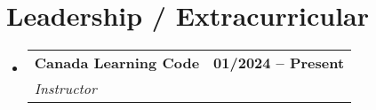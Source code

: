 \documentclass[letterpaper,11pt]{article}
\makeatletter
\newcommand{\resumeItem}[1]{
  \item\small{
    {#1 \vspace{-2pt}}
  }
}
\newcommand{\resumeSubheading}[4]{
  \vspace{-2pt}\item
    \begin{tabular*}{1.0\textwidth}[t]{l@{\extracolsep{\fill}}r}
      \textbf{#1} & \textbf{\small #2} \\
      \textit{\small#3} & \textit{\small #4} \\
    \end{tabular*}\vspace{-7pt}
}
\newcommand{\resumeSubHeadingListStart}{\begin{itemize}[leftmargin=0.0in, label={}]}
\newcommand{\resumeSubHeadingListEnd}{\end{itemize}}
\newcommand{\resumeItemListStart}{\begin{itemize}}
\newcommand{\resumeItemListEnd}{\end{itemize}\vspace{-5pt}}
\makeatother
\begin{document}
\section{Leadership / Extracurricular}
    \resumeSubHeadingListStart
        \resumeSubheading{Canada Learning Code}{01/2024 -- Present}{Instructor}{}
    \resumeSubHeadingListEnd
\end{document}
